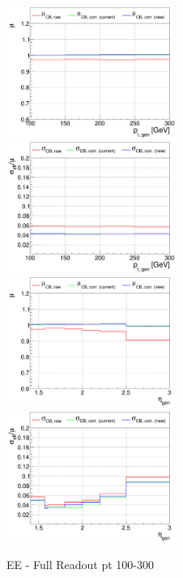 \begin{figure}
\includegraphics[width=0.495\textwidth]{./ECAL_plots/plotsNoPU/EE/pdf/FULL/GENPT/EEFULL_GENPT_0100_0300_MuOverBins.pdf}
\includegraphics[width=0.495\textwidth]{./ECAL_plots/plotsNoPU/EE/pdf/FULL/GENPT/EEFULL_GENPT_0100_0300_EffSigmaOverBins.pdf}
\includegraphics[width=0.495\textwidth]{./ECAL_plots/plotsNoPU/EE/pdf/FULL/GENETA/EEFULL_GENETA_0100_0300_MuOverBins.pdf}
\includegraphics[width=0.495\textwidth]{./ECAL_plots/plotsNoPU/EE/pdf/FULL/GENETA/EEFULL_GENETA_0005_0020_EffSigmaOverBins.pdf}
\caption{EE - Full Readout pt 100-300}
\end{figure}




